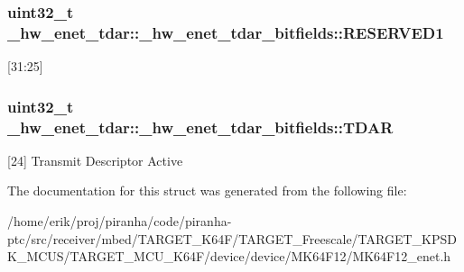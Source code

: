 \subsubsection[{\texorpdfstring{R\+E\+S\+E\+R\+V\+E\+D1}{RESERVED1}}]{\setlength{\rightskip}{0pt plus 5cm}uint32\+\_\+t \+\_\+hw\+\_\+enet\+\_\+tdar\+::\+\_\+hw\+\_\+enet\+\_\+tdar\+\_\+bitfields\+::\+R\+E\+S\+E\+R\+V\+E\+D1}\hypertarget{struct__hw__enet__tdar_1_1__hw__enet__tdar__bitfields_a376799321f66e829ea1b921c8b1f7d2d}{}\label{struct__hw__enet__tdar_1_1__hw__enet__tdar__bitfields_a376799321f66e829ea1b921c8b1f7d2d}
\mbox{[}31\+:25\mbox{]} 
\subsubsection[{\texorpdfstring{T\+D\+AR}{TDAR}}]{\setlength{\rightskip}{0pt plus 5cm}uint32\+\_\+t \+\_\+hw\+\_\+enet\+\_\+tdar\+::\+\_\+hw\+\_\+enet\+\_\+tdar\+\_\+bitfields\+::\+T\+D\+AR}\hypertarget{struct__hw__enet__tdar_1_1__hw__enet__tdar__bitfields_a48160d7dfea7d86035eec5bae27a9548}{}\label{struct__hw__enet__tdar_1_1__hw__enet__tdar__bitfields_a48160d7dfea7d86035eec5bae27a9548}
\mbox{[}24\mbox{]} Transmit Descriptor Active 

The documentation for this struct was generated from the following file\+:\begin{DoxyCompactItemize}
\item 
/home/erik/proj/piranha/code/piranha-\/ptc/src/receiver/mbed/\+T\+A\+R\+G\+E\+T\+\_\+\+K64\+F/\+T\+A\+R\+G\+E\+T\+\_\+\+Freescale/\+T\+A\+R\+G\+E\+T\+\_\+\+K\+P\+S\+D\+K\+\_\+\+M\+C\+U\+S/\+T\+A\+R\+G\+E\+T\+\_\+\+M\+C\+U\+\_\+\+K64\+F/device/device/\+M\+K64\+F12/M\+K64\+F12\+\_\+enet.\+h\end{DoxyCompactItemize}
